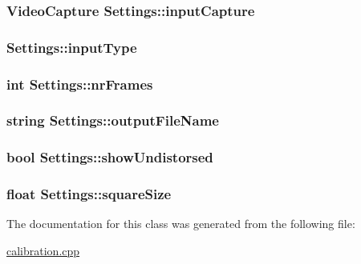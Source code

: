 \hypertarget{classSettings_abd5706146b34d3c32aef4025dcd2ec1b}{
\subsubsection[{input\-Capture}]{\setlength{\rightskip}{0pt plus 5cm}Video\-Capture Settings\-::input\-Capture}}\label{classSettings_abd5706146b34d3c32aef4025dcd2ec1b}
\hypertarget{classSettings_a89fb14ce9856fb642f18bb0f7c5b8868}{
\subsubsection[{input\-Type}]{ Settings\-::input\-Type}}\label{classSettings_a89fb14ce9856fb642f18bb0f7c5b8868}
\hypertarget{classSettings_a7e6654cd0e51791ed687eaa85f8fc143}{
\subsubsection[{nr\-Frames}]{\setlength{\rightskip}{0pt plus 5cm}int Settings\-::nr\-Frames}}\label{classSettings_a7e6654cd0e51791ed687eaa85f8fc143}
\hypertarget{classSettings_a9468f1ad53e982f9541d76c8d3228900}{
\subsubsection[{output\-File\-Name}]{\setlength{\rightskip}{0pt plus 5cm}string Settings\-::output\-File\-Name}}\label{classSettings_a9468f1ad53e982f9541d76c8d3228900}
\hypertarget{classSettings_a935d6f27ee454e9fee63f8b662f48a06}{
\subsubsection[{show\-Undistorsed}]{\setlength{\rightskip}{0pt plus 5cm}bool Settings\-::show\-Undistorsed}}\label{classSettings_a935d6f27ee454e9fee63f8b662f48a06}
\hypertarget{classSettings_a6c94708776ad1ce258fc44f2101f5941}{
\subsubsection[{square\-Size}]{\setlength{\rightskip}{0pt plus 5cm}float Settings\-::square\-Size}}\label{classSettings_a6c94708776ad1ce258fc44f2101f5941}


The documentation for this class was generated from the following file\-:\begin{DoxyCompactItemize}
\item 
\hyperlink{calibration_8cpp}{calibration.\-cpp}\end{DoxyCompactItemize}

